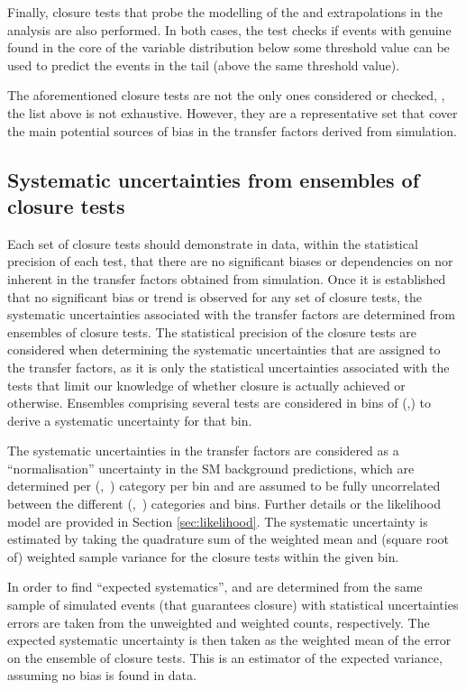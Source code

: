 Finally, closure tests that probe the modelling of the \alphat and
\bdphi extrapolations in the analysis are also performed. In both
cases, the test checks if events with genuine \met found in the core
of the variable distribution below some threshold value can be used to
predict the events in the tail (above the same threshold value). 

The aforementioned closure tests are not the only ones considered or
checked, \ie, the list above is not exhaustive. However, they are a
representative set that cover the main potential sources of bias in
the transfer factors derived from simulation. 

\subsection{Systematic uncertainties from ensembles of closure tests\label{sec:syst-from-closure}}

Each set of closure tests should demonstrate in data, within the
statistical precision of each test, that there are no significant
biases or dependencies on \njet nor \scalht inherent in the transfer
factors obtained from simulation. 
Once it is established that no significant bias or trend is observed
for any set of closure tests, the systematic uncertainties associated
with the transfer factors are determined from ensembles of closure
tests. The statistical precision of the closure tests are considered
when determining the systematic uncertainties that are assigned to the
transfer factors, as it is only the statistical uncertainties
associated with the tests that limit our knowledge of whether closure
is actually achieved or otherwise. Ensembles comprising several tests
are considered in bins of (\njet,\scalht) to derive a systematic
uncertainty for that bin. 

The systematic uncertainties in the transfer factors are considered as
a ``normalisation'' uncertainty in the SM background predictions,
which are determined per (\njet,~\nb) category per \scalht bin and are
assumed to be fully uncorrelated between the different (\njet,~\nb)
categories and \scalht bins. Further details or the likelihood model
are provided in Section \ref{sec:likelihood}. The systematic
uncertainty is estimated by taking the quadrature sum of the weighted
mean and (square root of) weighted sample variance for the closure
tests within the given \scalht bin.

In order to find ``expected systematics'', \nobs and \npre are
determined from the same sample of simulated events (that guarantees
closure) with statistical uncertainties errors are taken from the
unweighted and weighted counts, respectively. The expected systematic
uncertainty is then taken as the weighted mean of the error on the
ensemble of closure tests. This is an estimator of the expected
variance, assuming no bias is found in data.

